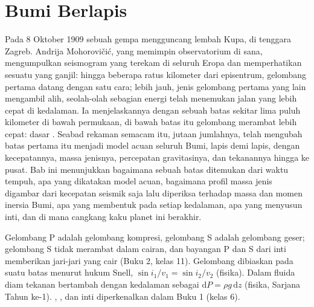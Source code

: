 \chapter{Bumi Berlapis}\label{ch:b1:layered-earth}

Pada 8 Oktober 1909 sebuah gempa mengguncang lembah Kupa, di tenggara Zagreb.
Andrija Mohorovičić, yang memimpin observatorium di sana, mengumpulkan seismogram yang terekam di seluruh Eropa dan memperhatikan sesuatu yang ganjil: hingga beberapa ratus kilometer dari episentrum, gelombang pertama datang dengan satu cara; lebih jauh, jenis gelombang pertama yang lain mengambil alih, seolah-olah sebagian energi telah menemukan jalan yang lebih cepat di kedalaman. Ia menjelaskannya dengan sebuah batas sekitar lima puluh kilometer di bawah permukaan, di bawah batas itu gelombang merambat lebih cepat: dasar . Seabad rekaman semacam itu, jutaan jumlahnya, telah mengubah batas pertama itu menjadi model acuan seluruh Bumi, lapis demi lapis, dengan kecepatannya, massa jenisnya, percepatan gravitasinya, dan tekanannya hingga ke pusat. Bab ini menunjukkan bagaimana sebuah batas ditemukan dari waktu tempuh, apa yang dikatakan model acuan, bagaimana profil massa jenis digambar dari kecepatan seismik saja lalu diperiksa terhadap massa dan momen inersia Bumi,  apa yang membentuk  pada setiap kedalaman, apa yang menyusun inti, dan di mana cangkang kaku planet ini berakhir.

\begin{recall}
Gelombang P adalah gelombang kompresi, gelombang S adalah gelombang geser; gelombang S tidak merambat dalam cairan, dan bayangan P dan S dari inti memberikan jari-jari  yang cair (Buku 2, kelas 11). Gelombang dibiaskan pada suatu batas menurut hukum Snell, $\sin i_1/v_1 = \sin i_2/v_2$ (fisika). Dalam fluida diam tekanan bertambah dengan kedalaman sebagai $\mathrm dP = \rho g\,\mathrm dz$ (fisika, Sarjana Tahun ke-1). , , dan inti diperkenalkan dalam Buku 1 (kelas 6).
\end{recall}

